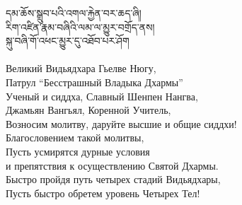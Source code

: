 དམ་ཆོས་སྒྲུབ་པའི་འགལ་རྐྱེན་བར་ཆད་ཞི།\\
རིག་འཛིན་རྣམ་བཞིའི་ལམ་ལ་མྱུར་བགྲོད་ནས།\\
སྐུ་བཞི་གོ་འཕང་མྱུར་དུ་འཐོབ་པར་ཤོག\\
\\
\ru
Великий Видьядхара Гьелве Нюгу,\\
Патрул “Бесстрашный Владыка Дхармы”\\
Ученый и сиддха, Славный Шенпен Нангва,\\
Джамьян Вангьял, Коренной Учитель,\\
Возносим молитву, даруйте высшие и общие сиддхи!\\
Благословением такой молитвы,\\
Пусть усмирятся дурные условия\\
\indent и препятствия к осуществлению Святой Дхармы.\\
Быстро пройдя путь четырех стадий Видьядхары,\\
Пусть быстро обретем уровень Четырех Тел!
\\
\newpage
